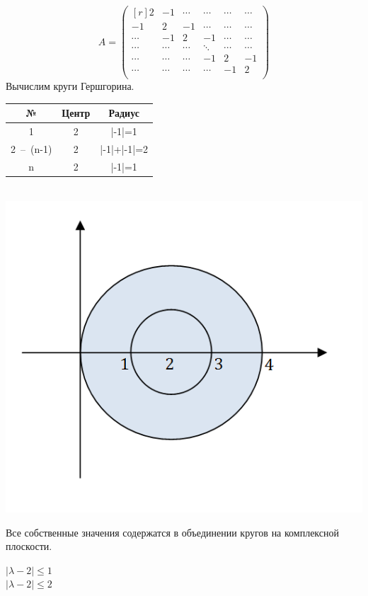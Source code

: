 \documentclass[12pt]{article}
\theoremstyle{definition}
\numberwithin{equation}{section}
\begin{document}
	\[A=\begin{pmatrix}[r]
	2 & -1 & \cdots & \cdots & \cdots & \cdots\\
	-1 & 2 & -1 & \cdots & \cdots & \cdots\\
	\cdots & -1 & 2 & -1 & \cdots & \cdots\\
	\cdots & \cdots & \cdots & \ddots & \cdots & \cdots\\
	\cdots & \cdots & \cdots & -1 & 2 & -1\\
	\cdots & \cdots & \cdots & \cdots & -1 & 2\\
	\end{pmatrix}\]
	Вычислим круги Гершгорина.
	\begin{center}
		\begin{tabular}{|c|c|c|}
			\hline
			№ & Центр & Радиус \\ \hline
			1 & 2 & |-1|=1 \\ \hline
			2~--~(n-1) & 2 & |-1|+|-1|=2 \\ \hline
			n & 2 & |-1|=1 \\ \hline
		\end{tabular}\\
		\includegraphics[scale=0.8]{l9_3.png}
	\end{center}
	Все собственные значения содержатся в объединении кругов на комплексной плоскости.\\
	\begin{center}
		$|\lambda-2|\leqslant 1$\\
		$|\lambda-2|\leqslant 2$
	\end{center}
\end{document}
